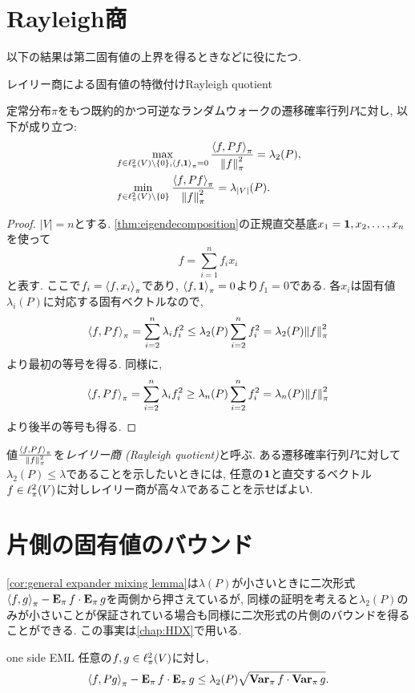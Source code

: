 \section{Rayleigh商} \label{sec:Rayleigh quotient}
以下の結果は第二固有値の上界を得るときなどに役にたつ.
\begin{lemma}{レイリー商による固有値の特徴付け}{Rayleigh quotient}

  定常分布$\pi$をもつ既約的かつ可逆なランダムウォークの遷移確率行列$P$に対し, 以下が成り立つ:
  \begin{align*}
    &\max_{f \in \ell^2_\pi(V)\setminus\{0\},\left\langle f,\mathbf{1}\right\rangle_{\pi}=0}\frac{\left\langle f,Pf\right\rangle_{\pi}}{\left\lVert f\right\rVert_{\pi}^2}=\lambda_2(P),\\
    &\min_{f \in \ell^2_\pi(V)\setminus\{0\}}\frac{\left\langle f,Pf\right\rangle_{\pi}}{\left\lVert f\right\rVert_{\pi}^2}=\lambda_{|V|}(P).
  \end{align*}
\end{lemma}
\begin{proof}
  $|V|=n$とする.
  \cref{thm:eigendecomposition}の正規直交基底$x_1=\mathbf{1},x_2,\dots,x_n$を使って
  \[
    f = \sum_{i=1}^n f_i x_i
  \]
  と表す.
  ここで$f_i = \left\langle f,x_i\right\rangle_{\pi}$であり, $\left\langle f,\mathbf{1}\right\rangle_{\pi}=0$より$f_1 =0$である.
  各$x_i$は固有値$\lambda_i(P)$に対応する固有ベクトルなので,
  \begin{align*}
    \piprod{f,Pf} = \sum_{i=2}^n\lambda_i f_i^2 \le \lambda_2(P) \sum_{i=2}^n f_i^2 = \lambda_2(P) \pinorm{f}^2
  \end{align*}
  より最初の等号を得る.
  同様に,
  \begin{align*}
    \piprod{f,Pf} = \sum_{i=2}^n\lambda_i f_i^2 \ge \lambda_n(P) \sum_{i=2}^n f_i^2 = \lambda_n(P) \pinorm{f}^2
  \end{align*}
  より後半の等号も得る.
\end{proof}

値$\frac{\left\langle f,Pf\right\rangle_{\pi}}{\left\lVert f\right\rVert_{\pi}^2}$を\emph{レイリー商 (Rayleigh quotient)}と呼ぶ.
ある遷移確率行列$P$に対して$\lambda_2(P) \le \lambda$であることを示したいときには,
任意の$\mathbf{1}$と直交するベクトル$f\in\ell^2_\pi(V)$に対しレイリー商が高々$\lambda$であることを示せばよい.


\section{片側の固有値のバウンド}
\cref{cor:general expander mixing lemma}は$\lambda(P)$が小さいときに二次形式$\left\langle f,g\right\rangle_{\pi} - \operatorname*{\mathbf{E}_{\pi}} f \cdot \operatorname*{\mathbf{E}_{\pi}} g$を両側から押さえているが,
同様の証明を考えると$\lambda_2(P)$のみが小さいことが保証されている場合も同様に二次形式の片側のバウンドを得ることができる.
この事実は\cref{chap:HDX}で用いる.
\begin{lemma}{}{one side EML}
  任意の$f,g\in \ell^2_\pi(V)$に対し,
  \[
    \left\langle f,Pg\right\rangle_{\pi} - \operatorname*{\mathbf{E}_{\pi}} f\cdot \operatorname*{\mathbf{E}_{\pi}} g \le \lambda_2(P)\sqrt{\operatorname*{\mathbf{Var}_{\pi}} f \cdot \operatorname*{\mathbf{Var}_{\pi}} g}.
  \]
\end{lemma}

